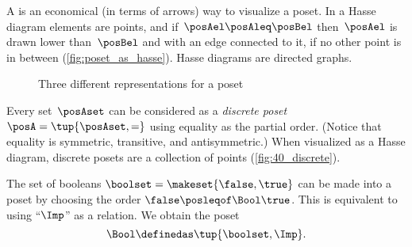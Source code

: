 A \emph{} is an economical (in terms of arrows) way to visualize a poset.
In a Hasse diagram elements are points, and if~$\posAel \posAleq \posBel$ then~$\posAel$ is drawn lower than~$\posBel$ and with an edge connected to it, if no other point is in between (\cref{fig:poset_as_hasse}).
Hasse diagrams are directed graphs.

\begin{figure*}[h!]
    \hspace{4em}
    \hspace{4em}
    \hspace{4em}
    \caption{Three different representations for a poset}
    \label{fig:poset_representation}
\end{figure*}

\hfill

\begin{marginfigure}
    \centering
    \caption{}
    \label{fig:40_discrete}
\end{marginfigure}

\begin{example}
    \label{ex:discreteposet}
    Every set~$\posAset$ can be considered as a \emph{discrete poset}~$\posA = \tup{\posAset,=}$ using equality as the partial order.
    (Notice that equality is symmetric, transitive, and antisymmetric.)
    When visualized as a Hasse diagram, discrete posets are a collection of points (\cref{fig:40_discrete}).
\end{example}

\begin{marginfigure}
    \centering
    \caption{}
\end{marginfigure}

\begin{definition}
    \label{def:bool-poset}
    The set of booleans $\boolset = \makeset{\false, \true}$ can be made into a poset by choosing the order $\false \posleqof\Bool \true$.
    This is equivalent to using ``$\Imp$'' as a relation.
    We obtain the poset
    \begin{equation}
        \label{eq:bool-poset}
        \Bool \definedas \tup{\boolset, \Imp}.
    \end{equation}
\end{definition}

